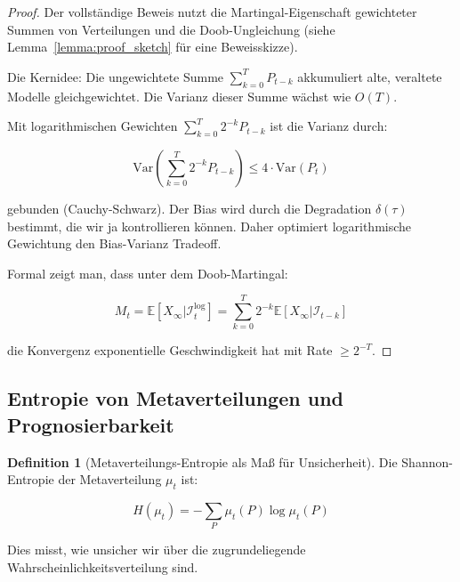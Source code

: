 \documentclass[a4paper, 12pt, twoside, openright]{report}
\theoremstyle{definition}
\newtheorem{definition}[theorem]{Definition}
\theoremstyle{definition}
\newcommand{\E}{\mathbb{E}}
\begin{document}
\begin{proof}
Der vollständige Beweis nutzt die Martingal-Eigenschaft gewichteter Summen von Verteilungen und die Doob-Ungleichung (siehe Lemma~\ref{lemma:proof_sketch} für eine Beweisskizze).

Die Kernidee: Die ungewichtete Summe $\sum_{k=0}^T P_{t-k}$ akkumuliert alte, veraltete Modelle gleichgewichtet. Die Varianz dieser Summe wächst wie $O(T)$.

Mit logarithmischen Gewichten $\sum_{k=0}^T 2^{-k} P_{t-k}$ ist die Varianz durch:

\begin{equation}
\text{Var}\left(\sum_{k=0}^T 2^{-k} P_{t-k}\right) \leq 4 \cdot \text{Var}(P_t)
\end{equation}

gebunden (Cauchy-Schwarz). Der Bias wird durch die Degradation $\delta(\tau)$ bestimmt, die wir ja kontrollieren können. Daher optimiert logarithmische Gewichtung den Bias-Varianz Tradeoff.

Formal zeigt man, dass unter dem Doob-Martingal:

\begin{equation}
M_t = \E[X_\infty | \mathcal{I}_t^{\log}] = \sum_{k=0}^{T} 2^{-k} \E[X_\infty | \mathcal{I}_{t-k}]
\end{equation}

die Konvergenz exponentielle Geschwindigkeit hat mit Rate $\geq 2^{-T}$.
\end{proof}

\subsection{Entropie von Metaverteilungen und Prognosierbarkeit}

\begin{definition}[Metaverteilungs-Entropie als Maß für Unsicherheit]
Die Shannon-Entropie der Metaverteilung $\mu_t$ ist:

\begin{equation}
H(\mu_t) = -\sum_P \mu_t(P) \log \mu_t(P)
\label{eq:meta_entropy}
\end{equation}

Dies misst, wie unsicher wir über die zugrundeliegende Wahrscheinlichkeitsverteilung sind.
\end{definition}
\end{document}
